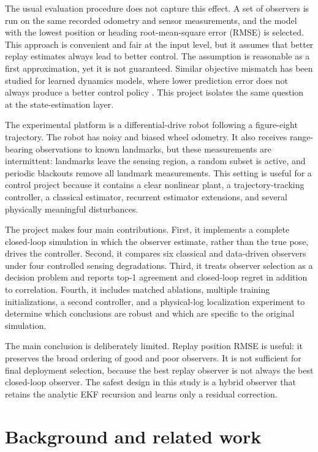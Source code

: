 \documentclass[11pt]{article}
\begin{document}
The usual evaluation procedure does not capture this effect. A set of observers is run on the same recorded odometry and sensor measurements, and the model with the lowest position or heading root-mean-square error (RMSE) is selected. This approach is convenient and fair at the input level, but it assumes that better replay estimates always lead to better control. The assumption is reasonable as a first approximation, yet it is not guaranteed. Similar objective mismatch has been studied for learned dynamics models, where lower prediction error does not always produce a better control policy \cite{lambert2020objective}. This project isolates the same question at the state-estimation layer.

The experimental platform is a differential-drive robot following a figure-eight trajectory. The robot has noisy and biased wheel odometry. It also receives range-bearing observations to known landmarks, but these measurements are intermittent: landmarks leave the sensing region, a random subset is active, and periodic blackouts remove all landmark measurements. This setting is useful for a control project because it contains a clear nonlinear plant, a trajectory-tracking controller, a classical estimator, recurrent estimator extensions, and several physically meaningful disturbances.

The project makes four main contributions. First, it implements a complete closed-loop simulation in which the observer estimate, rather than the true pose, drives the controller. Second, it compares six classical and data-driven observers under four controlled sensing degradations. Third, it treats observer selection as a decision problem and reports top-1 agreement and closed-loop regret in addition to correlation. Fourth, it includes matched ablations, multiple training initializations, a second controller, and a physical-log localization experiment to determine which conclusions are robust and which are specific to the original simulation.

The main conclusion is deliberately limited. Replay position RMSE is useful: it preserves the broad ordering of good and poor observers. It is not sufficient for final deployment selection, because the best replay observer is not always the best closed-loop observer. The safest design in this study is a hybrid observer that retains the analytic EKF recursion and learns only a residual correction.

\section{Background and related work}
\end{document}
